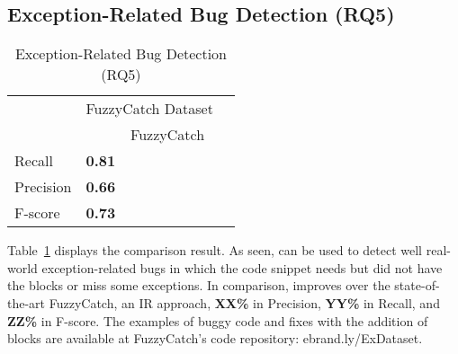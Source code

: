 \subsection{Exception-Related Bug Detection (RQ5)}
\label{sec:rq1}

\begin{table}[t]%
  \caption {Exception-Related Bug Detection (RQ5)}
  \vspace{-12pt}
  \small
	\begin{center}
		\renewcommand{\arraystretch}{1}
		\begin{tabular}{|p{1.5cm}<{\centering}|p{1.25cm}<{\centering}|p{1.75cm}<{\centering}|p{1.25cm}<{\centering}}
		  \hline
			\multirow{2}{*}{} & \multicolumn{2}{c|}{FuzzyCatch Dataset} \\
			\cline{2-3}
			  & \tool  & FuzzyCatch~\cite{xrank-fse20} \\
			\hline
			Recall    & \textbf{0.81} & \\
			Precision & \textbf{0.66} & \\
			F-score   & \textbf{0.73} & \\
			\hline
		\end{tabular}
		\label{tab:bug}
	\end{center}
\end{table}


Table~\ref{tab:bug} displays the comparison result. As seen, {\tool}
can be used to detect well real-world exception-related bugs in which
the code snippet needs but did not have the  blocks or
miss some exceptions. In comparison, {\tool} improves over the
state-of-the-art FuzzyCatch, an IR approach, {\bf XX\%} in Precision,
{\bf YY\%} in Recall, and {\bf ZZ\%} in F-score. The examples of buggy
code and fixes with the addition of  blocks are
available at FuzzyCatch's code repository: ebrand.ly/ExDataset.
